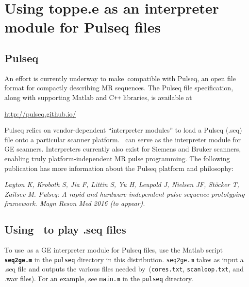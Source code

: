 
\chapter{Using toppe.e as an interpreter module for Pulseq files}
\label{ch:pulseq}

\section{Pulseq}
An effort is currently underway to make\toppe~compatible with Pulseq, an open file format for compactly describing MR sequences.
The Pulseq file specification, along with supporting Matlab and C\texttt{++} libraries, is available at
\begin{center}
\url{http://pulseq.github.io/}
\end{center}
Pulseq relies on vendor-dependent ``interpreter modules'' to load a Pulseq (.seq) file onto a particular scanner platform.
\toppe~can serve as the interpreter module for GE scanners.
Interpreters currently also exist for Siemens and Bruker scanners, enabling truly platform-independent MR pulse programming.
The following publication has more information about the Pulseq platform and philosophy:

\vspace{10pt}
{\it \small Layton K, Kroboth S, Jia F, Littin S, Yu H, Leupold J, Nielsen JF, St{\"o}cker T, Zaitsev M. Pulseq: A rapid and hardware-independent pulse sequence prototyping framework. Magn Reson Med 2016 (to appear).}
\vspace{10pt}


\section{Using \toppe~to play .seq files}
To use\toppe~as a GE interpreter module for Pulseq files, use the Matlab script {\tt \bf seq2ge.m} in the {\tt pulseq} directory in this distribution.
{\tt seq2ge.m} takes as input a .seq file and outputs the various files needed by\toppe~({\tt cores.txt}, {\tt scanloop.txt}, and .wav files).
For an example, see \texttt{main.m} in the \texttt{pulseq} directory.


